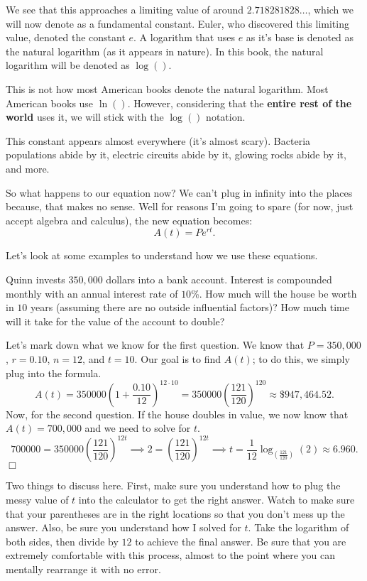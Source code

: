 \documentclass[../book.tex]{subfiles}
\begin{document}
We see that this approaches a limiting value of around $2.718281828\ldots$, which we will now denote as a fundamental constant.  Euler, who discovered this limiting value, denoted the constant $e$.  A logarithm that uses $e$ as it's base is denoted as the natural logarithm (as it appears in nature).  In this book, the natural logarithm will be denoted as $\log()$.

\begin{remark}
This is not how most American books denote the natural logarithm.  Most American books use $\ln()$.  However, considering that the \textbf{entire rest of the world} uses it, we will stick with the $\log()$ notation.
\end{remark}

This constant appears almost everywhere (it's almost scary).  Bacteria populations abide by it, electric circuits abide by it, glowing rocks abide by it, and more.

So what happens to our equation now?  We can’t plug in infinity into the places because, that makes no sense. Well for reasons I’m going to spare (for now, just accept algebra and calculus), the new equation becomes: $$A(t)=Pe^{rt}.$$

Let's look at some examples to understand how we use these equations.
\begin{example}
Quinn invests $350,000$ dollars into a bank account. Interest is compounded monthly with an annual interest rate of $10$\%. How much will the house be worth in $10$ years (assuming there are no outside influential factors)?  How much time will it take for the value of the account to double?
\end{example}
\begin{solution}
Let's mark down what we know for the first question.  We know that $P=350,000$, $r=0.10$, $n=12$, and $t=10$.  Our goal is to find $A(t)$; to do this, we simply plug into the formula.
$$A(t)=350000\left(1+\dfrac{0.10}{12}\right)^{12\cdot 10}=350000\left(\dfrac{121}{120}\right)^{120}\approx \$947,464.52.$$  Now, for the second question.  If the house doubles in value, we now know that $A(t)=700,000$ and we need to solve for $t$.  $$700000=350000\left(\dfrac{121}{120}\right)^{12t} \implies 2=\left(\dfrac{121}{120}\right)^{12t}\implies t=\dfrac{1}{12}\log_{\left(\frac{121}{120}\right)}(2) \approx 6.960.$$ $\Box$
\end{solution}
\begin{remark}
Two things to discuss here.  First, make sure you understand how to plug the messy value of $t$ into the calculator to get the right answer.  Watch to make sure that your parentheses are in the right locations so that you don't mess up the answer.  Also, be sure you understand how I solved for $t$.  Take the logarithm of both sides, then divide by $12$ to achieve the final answer.  Be sure that you are extremely comfortable with this process, almost to the point where you can mentally rearrange it with no error.
\end{remark}
\end{document}
